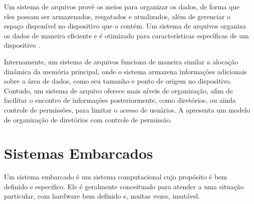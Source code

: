 Um sistema de arquivos provê os meios para organizar os dados, de forma que eles possam ser armazenados, resgatados e atualizados, além de gerenciar o espaço disponível no dispositivo que o contém. Um sistema de arquivos organiza os dados de maneira eficiente e é otimizado para características específicas de um dispositivo \cite{file_system}.

Internamente, um sistema de arquivos funciona de maneira similar a alocação dinâmica da memória principal, onde o sistema armazena informações adicionais sobre a área de dados, como seu tamanho e ponto de origem no dispositivo. Contudo, um sistema de arquivo oferece mais níveis de organização, afim de facilitar o encontro de informações posteriormente, como diretórios, ou ainda controle de permissões, para limitar o acesso de usuários. A  apresenta um modelo de organização de diretórios com controle de permissão.


%

\section{Sistemas Embarcados}

Um sistema embarcado é um sistema computacional cujo propósito é bem definido e especifico. Ele é geralmente conceituado para atender a uma situação particular, com hardware bem definido e, muitas vezes, imutável.

